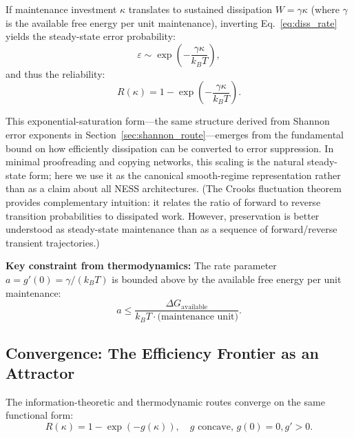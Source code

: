 \documentclass[11pt,twocolumn]{article}
\begin{document}
If maintenance investment $\kappa$ translates to sustained dissipation $W = \gamma \kappa$ (where $\gamma$ is the available free energy per unit maintenance), inverting Eq.~\eqref{eq:diss_rate} yields the steady-state error probability:
\begin{equation}
\varepsilon \sim \exp\!\left(-\frac{\gamma \kappa}{k_B T}\right),
\label{eq:thermo_error}
\end{equation}
and thus the reliability:
\begin{equation}
R(\kappa) = 1 - \exp\!\left(-\frac{\gamma \kappa}{k_B T}\right).
\label{eq:thermo_reliability}
\end{equation}

This exponential-saturation form---the same structure derived from Shannon error exponents in Section~\ref{sec:shannon_route}---emerges from the fundamental bound on how efficiently dissipation can be converted to error suppression. In minimal proofreading and copying networks, this scaling is the natural steady-state form; here we use it as the canonical smooth-regime representation rather than as a claim about all NESS architectures. (The Crooks fluctuation theorem~\cite{Crooks1999} provides complementary intuition: it relates the ratio of forward to reverse transition probabilities to dissipated work. However, preservation is better understood as steady-state maintenance than as a sequence of forward/reverse transient trajectories.)

\textbf{Key constraint from thermodynamics:} The rate parameter $a = g'(0) = \gamma/(k_B T)$ is bounded above by the available free energy per unit maintenance:
\begin{equation}
a \leq \frac{\Delta G_{\mathrm{available}}}{k_B T \cdot \text{(maintenance unit)}}.
\label{eq:a_thermo_bound}
\end{equation}

\subsection{Convergence: The Efficiency Frontier as an Attractor}
\label{sec:convergence}

The information-theoretic and thermodynamic routes converge on the same functional form:
\begin{equation}
R(\kappa) = 1 - \exp(-g(\kappa)), \quad g \text{ concave, } g(0) = 0, g' > 0.
\label{eq:unified_form}
\end{equation}
\end{document}
